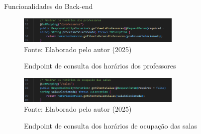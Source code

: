 \begin{frame}{Funcionalidades do Back-end}
    \begin{figure}
        \centering
        \vspace{-0.3cm}
        \caption{Endpoint de consulta dos horários dos professores}
        \vspace{-0.2cm}
        \includegraphics[width=0.7\textwidth]{figuras/back-5.png}
        \\ %
        \small Fonte: Elaborado pelo autor (2025)
    \end{figure}
    \begin{figure}
        \centering
        \vspace{-0.5cm}
        \caption{Endpoint de consulta dos horários de ocupação das salas}
        \vspace{-0.2cm}
        \includegraphics[width=0.7\textwidth]{figuras/back-6.png}
        \\ %
        \small Fonte: Elaborado pelo autor (2025)
    \end{figure}
\end{frame}

